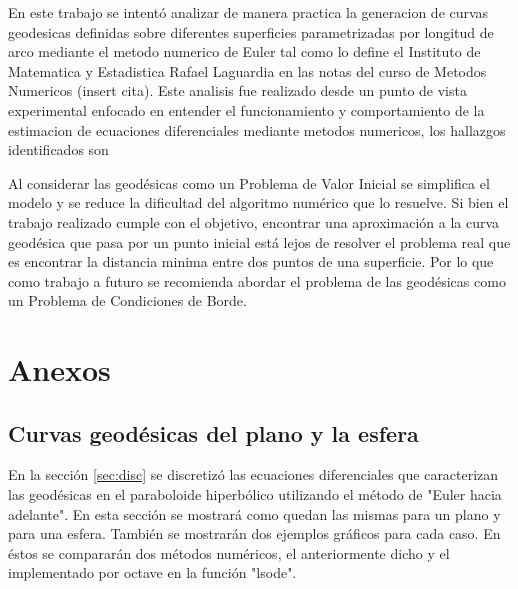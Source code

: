 \documentclass{endm}
\begin{document}
En este trabajo se intentó analizar de manera practica la generacion de curvas geodesicas definidas sobre diferentes superficies parametrizadas por longitud de arco mediante el metodo numerico de Euler tal como lo define el Instituto de Matematica y Estadistica Rafael Laguardia en las notas del curso de Metodos Numericos (insert cita). Este analisis fue realizado desde un punto de vista experimental enfocado en entender el funcionamiento y comportamiento de la estimacion de ecuaciones diferenciales mediante metodos numericos, los hallazgos identificados son 

Al considerar las geod\'esicas como un Problema de Valor Inicial se simplifica el modelo y se reduce la dificultad del algoritmo num\'erico que lo resuelve. Si bien el trabajo realizado cumple con el objetivo, encontrar una aproximaci\'on a la curva geod\'esica que pasa por un punto inicial est\'a lejos de resolver el problema real que es encontrar la distancia minima entre dos puntos de una superficie.  Por lo que como trabajo a futuro se recomienda abordar el problema de las geod\'esicas como un Problema de Condiciones de Borde.






%


\newpage

\section*{Anexos}

\subsection*{Curvas geod\'esicas del plano y la esfera}
En la secci\'on \ref{sec:disc} se discretiz\'o las ecuaciones diferenciales que caracterizan las geod\'esicas en el paraboloide hiperb\'olico utilizando el m\'etodo de "Euler hacia adelante". En esta secci\'on se mostrar\'a como quedan las mismas para un plano y para una esfera. Tambi\'en se mostrar\'an dos ejemplos gr\'aficos para cada caso. En \'estos se comparar\'an dos m\'etodos num\'ericos, el anteriormente dicho y el implementado por octave en la funci\'on "lsode".
\end{document}
